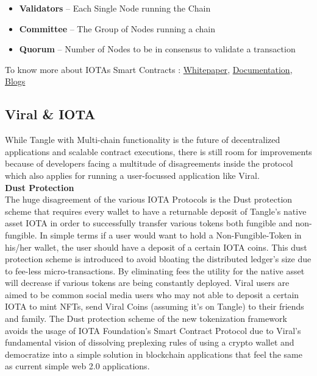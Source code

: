 \documentclass[10pt]{article}
\begin{document}
\begin{itemize}[leftmargin=+0.2in]
\item \textbf{Validators} – Each Single Node running the Chain
\item \textbf{Committee} – The Group of Nodes running a chain
\item \textbf{Quorum} – Number of Nodes to be in consensus to validate a transaction
\end{itemize}

To know more about IOTA\textsc{}s Smart Contracts : \hyperlink{https://files.iota.org/papers/ISC_WP_Nov_10_2021.pdf}{Whitepaper}, \hyperlink{https://wiki.iota.org/smart-contracts/overview}{Documentation}, \hyperlink{https://blog.iota.org/iota-smart-contracts-beta-release/}{Blogs}\\

\subsection{Viral \& IOTA}

While Tangle with Multi-chain functionality is the future of decentralized applications and scalable contract executions, there is still room for improvements because of developers facing a multitude of disagreements inside the protocol which also applies for running a user-focussed application like Viral. \\

\textbf{Dust Protection}\\

The huge disagreement of the various IOTA Protocols is the Dust protection scheme that requires every wallet to have a returnable deposit of Tangle's native asset IOTA in order to successfully transfer various tokens both fungible and non-fungible. In simple terms if a user would want to hold a Non-Fungible-Token in his/her wallet, the user should have a deposit of a certain IOTA coins. This dust protection scheme is introduced to avoid bloating the distributed ledger's size due to fee-less micro-transactions. By eliminating fees the utility for the native asset will decrease if various tokens are being constantly deployed. Viral users are aimed to be common social media users who may not able to deposit a certain IOTA to mint NFTs, send Viral Coins (assuming it's on Tangle) to their friends and family. The Dust protection scheme of the new tokenization framework avoids the usage of IOTA Foundation's Smart Contract Protocol due to Viral's fundamental vision of dissolving preplexing rules of using a crypto wallet and democratize into a simple solution in blockchain applications that feel the same as current simple web 2.0 applications.
\end{document}
